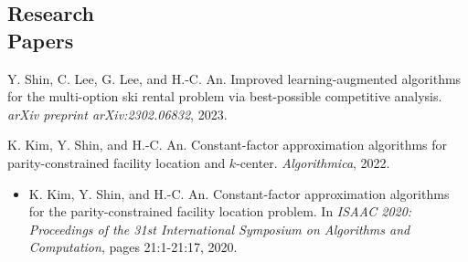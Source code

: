 \documentclass[margin, 10pt]{res} %
\begin{document}
\begin{resume}

\section{Research \\ Papers}
Y. Shin, C. Lee, G. Lee, and H.-C. An. Improved learning-augmented algorithms for the multi-option ski rental problem via best-possible competitive analysis. \emph{arXiv preprint arXiv:2302.06832}, 2023.

K. Kim, Y. Shin, and H.-C. An. Constant-factor approximation algorithms for parity-constrained facility location and $k$-center. \emph{Algorithmica}, 2022.
\begin{itemize} \itemsep -2pt %
\item[] K. Kim, Y. Shin, and H.-C. An. Constant-factor approximation algorithms for the parity-constrained facility location problem. In \emph{ISAAC 2020: Proceedings of the 31st International Symposium on Algorithms and Computation}, pages 21:1-21:17, 2020.
\end{itemize}


\end{resume}
\end{document}
